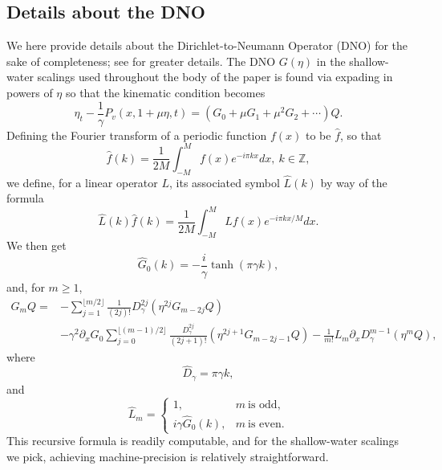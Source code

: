 \documentclass[a4paper,11pt]{article}
\newcommand{\ba}{\begin{array}}
\newcommand{\ea}{\end{array}}
\newcommand{\p}{\partial}
\begin{document}
\subsection*{Details about the DNO}
We here provide details about the Dirichlet-to-Neumann Operator (DNO) for the sake of completeness; see \cite{craig,guyenne} for greater details.    The DNO $G(\eta)$ in the shallow-water scalings used throughout the body of the paper is found via expading in powers of $\eta$ so that the kinematic condition becomes 
\[
\eta_{t} - \frac{1}{\gamma}P_{v}(x,1+\mu \eta,t) = \left(G_{0} + \mu G_{1} + \mu^{2}  G_{2} + \cdots \right)Q.
\]
Defining the Fourier transform of a periodic function $f(x)$ to be $\hat{f}$, so that 
\[
\hat{f}(k) = \frac{1}{2M}\int_{-M}^{M}f(x)e^{-i\pi k x} dx, ~ k\in \mathbb{Z},
\]
we define, for a linear operator $L$, its associated symbol $\hat{L}(k)$ by way of the formula 
\[
\hat{L}(k)\hat{f}(k) = \frac{1}{2M}\int_{-M}^{M} Lf(x) e^{-i\pi k x/M}dx.
\]
We then get 
\[
\hat{G}_{0}(k) = -\frac{i}{\gamma}\tanh(\pi \gamma k),
\]
and, for $m\geq 1$, 
\begin{align*}
G_{m}Q = & -\sum_{j=1}^{\lfloor{m/2}\rfloor}\frac{1}{(2j)!}D^{2j}_{\gamma}\left(\eta^{2j}G_{m-2j}Q\right) \\
& - \gamma^{2}\p_{x}G_{0} \sum_{j=0}^{\lfloor{(m-1)/2}\rfloor}\frac{D_{\gamma}^{2j}}{(2j+1)!}\left(\eta^{2j+1}G_{m-2j-1}Q\right) - \frac{1}{m!}L_{m} \p_{x}D_{\gamma}^{m-1}\left(\eta^{m}Q \right),
\end{align*}
where
\[
\hat{D}_{\gamma} = \pi \gamma k,
\]
and
\[
\hat{L}_{m} = \left\{
\ba{rl}
1,  & m~\mbox{is odd}, \\
i\gamma \hat{G}_{0}(k),  & m~\mbox{is even}.
\ea
\right.
\]
This recursive formula is readily computable, and for the shallow-water scalings we pick, achieving machine-precision is relatively straightforward.  


\end{document}
